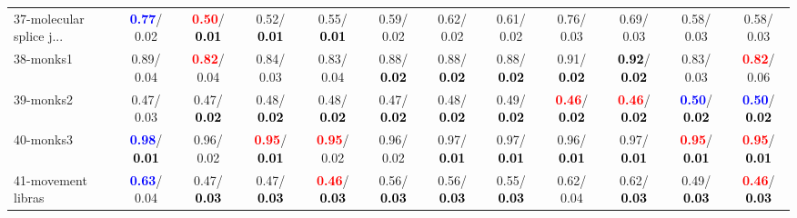 \begin{table}[h]
\begin{center}
{\begin{tabular}{lc|c|c|c|c|c|c|c|c|c|c}
37-molecular splice j... & \textcolor{blue}{\textbf{  0.77}}/  0.02 & \textcolor{red}{\textbf{  0.50}}/\textcolor{black}{\textbf{  0.01}} &   0.52/\textcolor{black}{\textbf{  0.01}} &   0.55/\textcolor{black}{\textbf{  0.01}} &   0.59/  0.02 &   0.62/  0.02 &   0.61/  0.02 &   0.76/  0.03 &   0.69/  0.03 &   0.58/  0.03 &   0.58/  0.03 \\
38-monks1 &   0.89/  0.04 & \textcolor{red}{\textbf{  0.82}}/  0.04 &   0.84/  0.03 &   0.83/  0.04 &   0.88/\textcolor{black}{\textbf{  0.02}} &   0.88/\textcolor{black}{\textbf{  0.02}} &   0.88/\textcolor{black}{\textbf{  0.02}} &   0.91/\textcolor{black}{\textbf{  0.02}} & \textcolor{black}{\textbf{  0.92}}/\textcolor{black}{\textbf{  0.02}} &   0.83/  0.03 & \textcolor{red}{\textbf{  0.82}}/  0.06 \\
39-monks2 &   0.47/  0.03 &   0.47/\textcolor{black}{\textbf{  0.02}} &   0.48/\textcolor{black}{\textbf{  0.02}} &   0.48/\textcolor{black}{\textbf{  0.02}} &   0.47/\textcolor{black}{\textbf{  0.02}} &   0.48/\textcolor{black}{\textbf{  0.02}} &   0.49/\textcolor{black}{\textbf{  0.02}} & \textcolor{red}{\textbf{  0.46}}/\textcolor{black}{\textbf{  0.02}} & \textcolor{red}{\textbf{  0.46}}/\textcolor{black}{\textbf{  0.02}} & \textcolor{blue}{\textbf{  0.50}}/\textcolor{black}{\textbf{  0.02}} & \textcolor{blue}{\textbf{  0.50}}/\textcolor{black}{\textbf{  0.02}} \\ \hline
40-monks3 & \textcolor{blue}{\textbf{  0.98}}/\textcolor{black}{\textbf{  0.01}} &   0.96/  0.02 & \textcolor{red}{\textbf{  0.95}}/\textcolor{black}{\textbf{  0.01}} & \textcolor{red}{\textbf{  0.95}}/  0.02 &   0.96/  0.02 &   0.97/\textcolor{black}{\textbf{  0.01}} &   0.97/\textcolor{black}{\textbf{  0.01}} &   0.96/\textcolor{black}{\textbf{  0.01}} &   0.97/\textcolor{black}{\textbf{  0.01}} & \textcolor{red}{\textbf{  0.95}}/\textcolor{black}{\textbf{  0.01}} & \textcolor{red}{\textbf{  0.95}}/\textcolor{black}{\textbf{  0.01}} \\
41-movement libras & \textcolor{blue}{\textbf{  0.63}}/  0.04 &   0.47/\textcolor{black}{\textbf{  0.03}} &   0.47/\textcolor{black}{\textbf{  0.03}} & \textcolor{red}{\textbf{  0.46}}/\textcolor{black}{\textbf{  0.03}} &   0.56/\textcolor{black}{\textbf{  0.03}} &   0.56/\textcolor{black}{\textbf{  0.03}} &   0.55/\textcolor{black}{\textbf{  0.03}} &   0.62/  0.04 &   0.62/\textcolor{black}{\textbf{  0.03}} &   0.49/\textcolor{black}{\textbf{  0.03}} & \textcolor{red}{\textbf{  0.46}}/\textcolor{black}{\textbf{  0.03}} \\

\end{tabular}}
\end{center}
\end{table}
